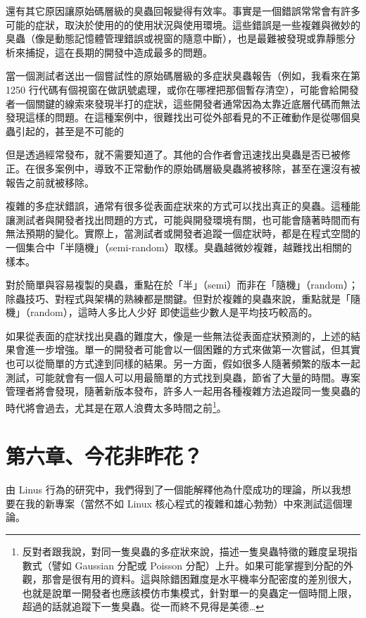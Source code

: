 \documentclass[10pt, b5paper]{book}
\makeatletter
\newcommand*{\shifttext}[2]{%
  \settowidth{\@tempdima}{#2}%
  \makebox[\@tempdima]{\hspace*{#1}#2}%
}
\makeatother
\begin{document}
還有其它原因讓原始碼層級的臭蟲回報變得有效率。事實是一個錯誤常常會有許多可能的症狀，取決於使用的的使用狀況與使用環境。這些錯誤是一些複雜與微妙的臭蟲（像是動態記憶體管理錯誤或視窗的隨意中斷），也是最難被發現或靠靜態分析來捕捉，這在長期的開發中造成最多的問題。

當一個測試者送出一個嘗試性的原始碼層級的多症狀臭蟲報告（例如，我看來在第
1250
行代碼有個視窗在做訊號處理，或你在哪裡把那個暫存清空），可能會給開發者一個關鍵的線索來發現半打的症狀，這些開發者通常因為太靠近底層代碼而無法發現這樣的問題。在這種案例中，很難找出可從外部看見的不正確動作是從哪個臭蟲引起的，甚至是不可能的
\shifttext{1pt}{---}\shifttext{-1pt}{---}
但是透過經常發布，就不需要知道了。其他的合作者會迅速找出臭蟲是否已被修正。在很多案例中，導致不正常動作的原始碼層級臭蟲將被移除，甚至在還沒有被報告之前就被移除。

複雜的多症狀錯誤，通常有很多從表面症狀來的方式可以找出真正的臭蟲。這種能讓測試者與開發者找出問題的方式，可能與開發環境有關，也可能會隨著時間而有無法預期的變化。實際上，當測試者或開發者追蹤一個症狀時，都是在程式空間的一個集合中「半隨機」（semi-random）取樣。臭蟲越微妙複雜，越難找出相關的樣本。

對於簡單與容易複製的臭蟲，重點在於「半」（semi）而非在「隨機」（random）；除蟲技巧、對程式與架構的熟練都是關鍵。但對於複雜的臭蟲來說，重點就是「隨機」（random），這時人多比人少好
\shifttext{1pt}{---}\shifttext{-1pt}{---} 即使這些少數人是平均技巧較高的。

如果從表面的症狀找出臭蟲的難度大，像是一些無法從表面症狀預測的，上述的結果會進一步增強。單一的開發者可能會以一個困難的方式來做第一次嘗試，但其實也可以從簡單的方式達到同樣的結果。另一方面，假如很多人隨著頻繁的版本一起測試，可能就會有一個人可以用最簡單的方式找到臭蟲，節省了大量的時間。專案管理者將會發現，隨著新版本發布，許多人一起用各種複雜方法追蹤同一隻臭蟲的時代將會過去，尤其是在眾人浪費太多時間之前\footnote{反對者跟我說，對同一隻臭蟲的多症狀來說，描述一隻臭蟲特徵的難度呈現指數式（譬如
  Gaussian 分配或 Poisson
  分配）上升。如果可能掌握到分配的外觀，那會是很有用的資料。這與除錯困難度是水平機率分配密度的差別很大，也就是說單一開發者也應該模仿市集模式，針對單一的臭蟲定一個時間上限，超過的話就追蹤下一隻臭蟲。從一而終不見得是美德\ldots{}}。

\newpage
\section{第六章、今花非昨花？}

由 Linus
行為的研究中，我們得到了一個能解釋他為什麼成功的理論，所以我想要在我的新專案（當然不如
Linux 核心程式的複雜和雄心勃勃）中來測試這個理論。
\end{document}
